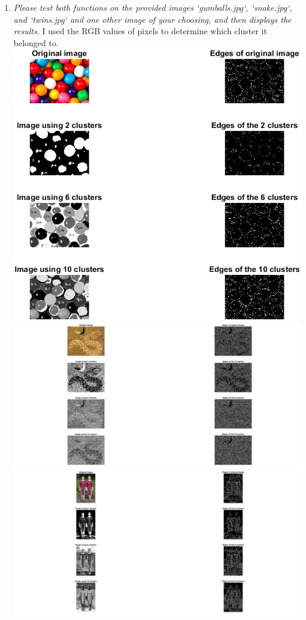 \documentclass[11pt]{article}
\begin{document}
\begin{enumerate}
        \item \textit{Please test both functions on the provided images ‘gumballs.jpg‘, ‘snake.jpg‘, and ‘twins.jpg‘
        and one other image of your choosing, and then displays the results.}\newline
        I used the RGB values of pixels to determine which cluster it belonged to.\newline
        \includegraphics[width=\textwidth]{Output Pictures/gumball_kmeans}\newline
        \includegraphics[width=\textwidth]{Output Pictures/snake_kmeans}\newline
        \includegraphics[width=\textwidth]{Output Pictures/twins_kmeans}\newline

\end{enumerate}
\end{document}
